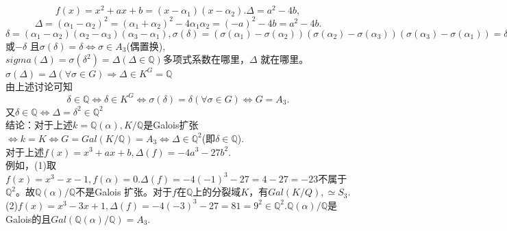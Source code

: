 \documentclass[UTF8]{article}
\begin{document}
$$f(x)=x^2+ax+b=(x-\alpha_1)(x-\alpha_2).\Delta=a^2-4b,$$
$$\Delta=(\alpha_1-\alpha_2)^2=(\alpha_1+\alpha_2)^2-4\alpha_1\alpha_2=(-a)^2-4b=a^2-4b.$$
$\delta=(\alpha_1-\alpha_2)(\alpha_2-\alpha_3)(\alpha_3-\alpha_1),\sigma(\delta)=(\sigma(\alpha_1)-\sigma(\alpha_2))(\sigma(\alpha_2)-\sigma(\alpha_3))(\sigma(\alpha_3)-\sigma(\alpha_1))=\delta$ 或$-\delta$ 且$\sigma(\delta)=\delta\Leftrightarrow \sigma\in A_3$(偶置换),\\$sigma(\Delta)=\sigma(\delta^2)=\Delta(\Delta\in \mathbb{Q})$多项式系数在哪里，$\Delta$ 就在哪里。\\
$\sigma(\Delta)=\Delta(\forall\sigma\in G)\Rightarrow \Delta \in K^G=\mathbb{Q}$\\
由上述讨论可知
$$\delta\in \mathbb{Q}\Leftrightarrow\delta\in K^G\Leftrightarrow\sigma(\delta)=\delta(\forall\sigma\in G)\Leftrightarrow G=A_3.$$
又$\delta\in \mathbb{Q}\Leftrightarrow\Delta=\delta^2\in \mathbb{Q}^2$\\
结论：对于上述$k=\mathbb{Q}(\alpha),K/\mathbb{Q}$是Galois扩张$\Leftrightarrow k=K\Leftrightarrow G=Gal(K/\mathbb{Q})=A_3\Leftrightarrow\Delta\in \mathbb{Q}^2$(即$\delta\in \mathbb{Q}$).\\
对于上述$f(x)=x^3+ax+b,\Delta(f)=-4a^3-27b^2.$\\
例如，(1)取$f(x)=x^3-x-1,f(\alpha)=0.\Delta(f)=-4(-1)^3-27=4-27=-23$不属于$\mathbb{Q}^2$。故$\mathbb{Q}(\alpha)/\mathbb{Q}$不是Galois 扩张。对于$f$在$\mathbb{Q}$上的分裂域$K$，有$Gal(K/Q),\simeq S_3.$\\
(2)$f(x)=x^3-3x+1,\Delta(f)=-4(-3)^3-27=81=9^2\in \mathbb{Q}^2.\mathbb{Q}(\alpha)/\mathbb{Q}$是Galois的且$Gal(\mathbb{Q}(\alpha)/\mathbb{Q})=A_3.$\\
\end{document}
